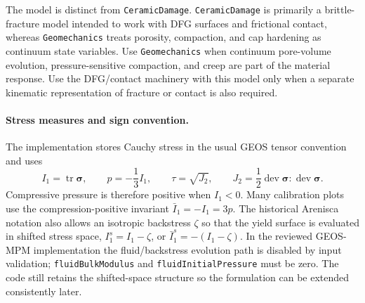 The model is distinct from \texttt{CeramicDamage}.  \texttt{CeramicDamage} is primarily a brittle-fracture model intended to work with DFG surfaces and frictional contact, whereas \texttt{Geomechanics} treats porosity, compaction, and cap hardening as continuum state variables.  Use \texttt{Geomechanics} when continuum pore-volume evolution, pressure-sensitive compaction, and creep are part of the material response.  Use the DFG/contact machinery with this model only when a separate kinematic representation of fracture or contact is also required.

\paragraph{Stress measures and sign convention.}
The implementation stores Cauchy stress in the usual GEOS tensor convention and uses
\begin{equation}
  I_1 = \operatorname{tr}\boldsymbol{\sigma}, \qquad
  p = -\frac{1}{3}I_1, \qquad
  \tau = \sqrt{J_2}, \qquad
  J_2 = \frac{1}{2}\operatorname{dev}\boldsymbol{\sigma}:\operatorname{dev}\boldsymbol{\sigma}.
  \label{eq:geomechanics-invariants}
\end{equation}
Compressive pressure is therefore positive when \(I_1<0\).  Many calibration plots use the compression-positive invariant \(\bar I_1=-I_1=3p\).  The historical Arenisca notation also allows an isotropic backstress \(\zeta\) so that the yield surface is evaluated in shifted stress space, \(I_1^s=I_1-\zeta\), or \(\bar I_1^s=-(I_1-\zeta)\).  In the reviewed GEOS-MPM implementation the fluid/backstress evolution path is disabled by input validation; \texttt{fluidBulkModulus} and \texttt{fluidInitialPressure} must be zero.  The code still retains the shifted-space structure so the formulation can be extended consistently later.

